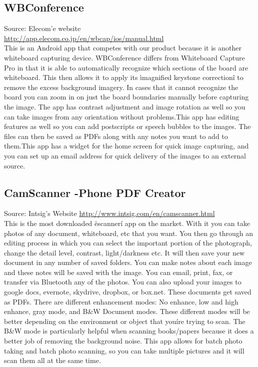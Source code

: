 \documentclass{article}
\begin{document}
				\subsection*{WBConference}
Source: Elecom'e website\\
{\color{red} \url{http://app.elecom.co.jp/en/wbcap/ios/manual.html}} \\
					
This is an Android app that competes with our product because it is another whiteboard capturing device. WBConference differs from Whiteboard Capture Pro in that it is able to automatically recognize which sections of the board are whiteboard. This then allows it to apply its ìmagnified keystone correctionî to remove the excess background imagery. In cases that it cannot recognize the board you can zoom in on just the board boundaries manually before capturing the image. The app has contrast adjustment and image rotation as well so you can take images from any orientation without problems.This app has editing features as well so you can add postscripts or speech bubbles to the images. The files can then be saved as PDFs along with any notes you want to add to them.This app has a widget for the home screen for quick image capturing, and you can set up an email address for quick delivery of the images to an external source. \\
				\subsection*{CamScanner -Phone PDF Creator}
Source: Intsig's Website
{\color{red} \url{http://www.intsig.com/en/camscanner.html}} \\
					
This is the most downloaded ëscannerí app on the market. With it you can take photos of any document, whiteboard, etc that you want. You then go through an editing process in which you can select the important portion of the photograph, change the detail level, contrast, light/darkness etc. It will then save your new document in any number of saved folders. You can make notes about each image and these notes will be saved with the image. You can email, print, fax, or transfer via Bluetooth any of the photos. You can also upload your images to google docs, evernote, skydrive, dropbox, or box.net. These documents get saved as PDFs. There are different enhancement modes: No enhance, low and high enhance, gray mode, and B\&W Document modes. These different modes will be better depending on the environment or object that youíre trying to scan. The B\&W mode is particularly helpful when scanning books/papers because it does a better job of removing the background noise. This app allows for batch photo taking and batch photo scanning, so you can take multiple pictures and it will scan them all at the same time. \\
\end{document}
